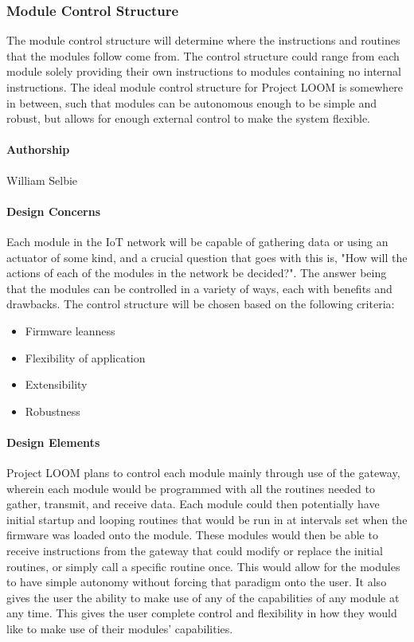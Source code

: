 \documentclass[onecolumn, draftclsnofoot,10pt, compsoc]{IEEEtran}
\begin{document}
\subsubsection{Module Control Structure}
    The module control structure will determine where the instructions and routines that the modules follow come from. The control structure could range from each module solely providing their own instructions to modules containing no internal instructions. The ideal module control structure for Project LOOM is somewhere in between, such that modules can be autonomous enough to be simple and robust, but allows for enough external control to make the system flexible.

\paragraph{Authorship}
    William Selbie

\paragraph{Design Concerns}
    Each module in the IoT network will be capable of gathering data or using an actuator of some kind, and a crucial question that goes with this is, "How will the actions of each of the modules in the network be decided?". The answer being that the modules can be controlled in a variety of ways, each with benefits and drawbacks. The control structure will be chosen based on the following criteria:
    \begin{itemize}[noitemsep,topsep=-10pt]
        \item Firmware leanness
        \item Flexibility of application
        \item Extensibility
        \item Robustness
    \end{itemize}

\paragraph{Design Elements}
    Project LOOM plans to control each module mainly through use of the gateway, wherein each module would be programmed with all the routines needed to gather, transmit, and receive data. Each module could then potentially have initial startup and looping routines that would be run in at intervals set when the firmware was loaded onto the module. These modules would then be able to receive instructions from the gateway that could modify or replace the initial routines, or simply call a specific routine once. This would allow for the modules to have simple autonomy without forcing that paradigm onto the user. It also gives the user the ability to make use of any of the capabilities of any module at any time. This gives the user complete control and flexibility in how they would like to make use of their modules' capabilities.
\end{document}
